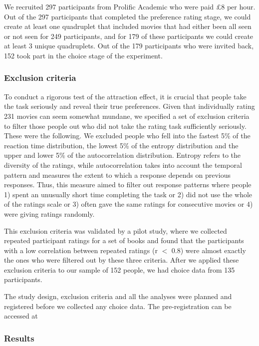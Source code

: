 \documentclass[12pt, a4paper]{article}
\begin{document}
  We recruited 297 participants from Prolific Academic who were paid £8 per hour. Out of the 297 participants that completed the preference rating stage, we could create at least one quadruplet that included movies that had either been all seen or not seen for 249 participants, and for 179 of these participants we could create at least 3 unique quadruplets. Out of the 179 participants who were invited back, 152 took part in the choice stage of the experiment.  
  



\subsubsection{Exclusion criteria} \label{exclusion_ref}

To conduct a rigorous test of the attraction effect, it is crucial that people take the task seriously and reveal their true preferences. Given that individually rating 231 movies can seem somewhat mundane, we specified a set of exclusion criteria to filter those people out who did not take the rating task sufficiently seriously. These were the following. We excluded people who fell into the fastest 5\% of the reaction time distribution, the lowest 5\% of the entropy distribution and the upper and lower 5\% of the autocorrelation distribution. Entropy refers to the diversity of the ratings, while autocorrelation takes into account the temporal pattern and measures the extent to which a response depends on previous responses. Thus, this measure aimed to filter out response patterns where people 1) spent an unusually short time completing the task or 2) did not use the whole of the ratings scale or 3) often gave the same ratings for consecutive movies or 4) were giving ratings randomly.

This exclusion criteria was validated by a pilot study, where we collected repeated participant ratings for a set of books and found that the participants with a low correlation between repeated ratings (r $<$ 0.8) were almost exactly the ones who were filtered out by these three criteria. After we applied these exclusion criteria to our sample of 152 people, we had choice data from 135 participants.

The study design, exclusion criteria and all the analyses were planned and registered before we collected any choice data. The pre-registration can be accessed at

\subsubsection{Results}
\end{document}
